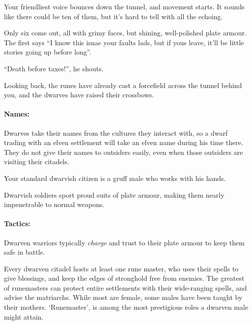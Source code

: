\begin{multicols}{2}
\begin{boxtext}
  Your friendliest voice bounces down the tunnel, and movement starts.
  It sounds like there could be ten of them, but it's hard to tell with all the echoing.

  Only six come out, all with grimy faces, but shining, well-polished plate armour.
  The first says ``I know this isnae your faults lads, but if yous leave, it'll be little stories going up before long''.

  ``Death before taxes!'', he shouts.

  Looking back, the runes have already cast a forcefield across the tunnel behind you, and the dwarves have raised their crossbows.

\end{boxtext}

\paragraph{Names:}
Dwarves take their names from the cultures they interact with, so a dwarf trading with an elven settlement will take an elven name during his time there.
They do not give their names to outsiders easily, even when those outsiders are visiting their citadels.

\label{dwarven_trader}

Your standard dwarvish citizen is a gruff male who works with his hands.

\dwarventrader

\label{dwarven_soldier}

Dwarvish soldiers sport proud suits of plate armour, making them nearly impenetrable to normal weapons.


\paragraph{Tactics:} Dwarven  warriors typically \textit{charge} and trust to their plate armour to keep them safe in battle.%

\label{dwarven_runemaster}

Every dwarven citadel hosts at least one rune master, who uses their spells to give blessings, and keep the edges of stronghold free from enemies.
The greatest of runemasters can protect entire settlements with their wide-ranging spells, and advise the matriarchs.
While most are female, some males have been taught by their mothers.
`Runemaster', is among the most prestigious roles a dwarven male might attain.


\end{multicols}
